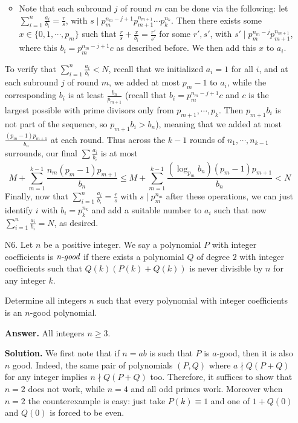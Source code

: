 \documentclass[11pt,a4paper]{article}
\begin{document}
\begin{enumerate}
\begin{itemize}
    		\item Note that each subround $j$ of round $m$ can be done via the following: 
    		let $\sum_{i=1}^n \frac{a_i}{b_i}=\frac{r}{s}$, 
    		with $s \mid p_m^{n_m-j+1}p_{m+1}^{n_{m+1}}\cdots p_k^{n_k}$. 
    		Then there exists some $x \in \{0, 1, \cdots, p_m\}$ such that $\frac{r}{s} + \frac{x}{b_i}=\frac{r'}{s'}$ for some $r', s'$, with 
    		$s' \mid p_m^{n_m-j}p_{m+1}^{n_{m+1}}$, 
    		where this $b_i=p_m^{n_m-j+1}c$ as described before. 
    		We then add this $x$ to $a_i$. 
    	\end{itemize}
    	To verify that $\sum_{i=1}^n \frac{a_i}{b_i} < N$, 
    	recall that we initialized $a_i=1$ for all $i$, 
    	and at each subround $j$ of round $m$, 
    	we added at most $p_m - 1$ to $a_i$, 
    	while the corresponding $b_i$ is at least $\frac{b_n}{p_{m+1}}$ 
    	(recall that $b_i = p_m^{n_m-j+1}c$ and $c$ is the largest possible with prime divisors only from $p_{m+1}, \cdots, p_k$. 
    	Then $p_{m+1}b_i$ is not part of the sequence, so $p_{m+1}b_i > b_n$), 
    	meaning that we added at most $\frac{(p_m-1)p_{m+1}}{b_n}$ at each round. 
    	Thus across the $k-1$ rounds of $n_1, \cdots, n_{k-1}$ surrounds, our final $\sum \frac{a_i}{b_i}$ is at most 
    	\[
    	M + \sum_{m=1}^{k-1} \frac{n_m(p_m-1)p_{m+1}}{b_n}
    	\le M + \sum_{m=1}^{k-1} \frac{(\log_{p_m} b_n)(p_m-1)p_{m+1}}{b_n} < N
    	\]
    	Finally, now that 
    	$\sum_{i=1}^n \frac{a_i}{b_i}=\frac rs$ with $s\mid p_m^{n_m}$ after these operations, 
    	we can just identify $i$ with $b_i=p_k^{n_k}$ and add a suitable number to $a_i$ such that now $\sum_{i=1}^n \frac{a_i}{b_i}=N$, as desired. 
    	
    	\item [N6.]
    	Let $n$ be a positive integer. We say a polynomial $P$ with integer coefficients is $\emph{n-good}$ if there exists a polynomial $Q$ of degree $2$ with integer coefficients such that $Q(k)(P(k) + Q(k))$ is never divisible by $n$ for any integer $k$.
    	
    	Determine all integers $n$ such that every polynomial with integer coefficients is an $n$-good polynomial. 
    	
    	\textbf{Answer.} All integers $n\ge 3$. 
    	
    	\textbf{Solution.} 
    	We first note that if $n = ab$ is such that $P$ is $a$-good, then it is also $n$ good. 
    	Indeed, the same pair of polynomials $(P, Q)$ where $a\nmid Q(P+Q)$ for any integer implies 
    	$n\nmid Q(P+Q)$ too. 
    	Therefore, it suffices to show that $n = 2$ does not work, while $n = 4$ and all odd primes work. 
    	Moreover when $n=2$ the counterexample is easy: just take $P(k)\equiv 1$ and one of $1+Q(0)$ and $Q(0)$ is forced to be even. 
    	

\end{enumerate}
\end{document}
